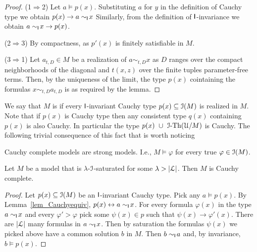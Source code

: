 \documentclass[10pt,oneside]{amsproc}
\renewcommand*{\emph}[1]{%
   \smash{\tikz[baseline]\node[rectangle, fill=teal!25, rounded corners, inner xsep=0.5ex, inner ysep=0.2ex, anchor=base, minimum height = 2.7ex]{\strut #1};}}
\begin{document}
\begin{proof}
  (1$\Rightarrow$2)
  Let $a\models p(x)$.
  Substituting $a$ for $y$ in the definition of Cauchy type we obtain $p(x)\rightarrow a\sim_{\sf I}\!x$
  Similarly, from the definition of ${\sf I}$-invariance we obtain $a\sim_{\sf I}\!x\rightarrow p(x)$.

  (2$\Rightarrow$3) 
  By compactness, as $p'(x)$ is finitely satisfiable in $M$.

  (3$\Rightarrow$1)  
  Let $a_{t,D}\in M$ be a realization of $a\sim_{t,D}x$ as $D$ ranges over the compact neighborhoods of the diagonal and $t(x,z)$ over the finite tuples parameter-free terms.
  Then, by the uniqueness of the limit, the type $p(x)$ cointaining the formulas $x\sim_{t,D}a_{t,D}$ is as required by the lemma.
\end{proof}

We say that $M$ is \emph{Cauchy complete\/} if every ${\sf I}$-invariant Cauchy type $p(x)\subseteq{\EuScript I}(M)$ is realized in $M$.
Note that if $p(x)$ is Cauchy type then any consistent type $q(x)$ containing $p(x)$ is also Cauchy.
In particular the type $p(x)\ \cup\ {\EuScript I}\mbox{-Th}({\EuScript U}/M)$ is Cauchy.
The following trivial consequence of this fact that is worth noticing

\begin{remark}
  Cauchy complete models are strong models. I.e., $M\models\varphi$ for every true $\varphi\in{\EuScript I}(M)$.
\end{remark}

\begin{fact}
  Let $M$ be a model that is $\lambda$-${\EuScript I}$-saturated for some $\lambda>|{\EuScript L}|$.
  Then $M$ is Cauchy complete.
\end{fact}

\begin{proof}  
  Let $p(x)\subseteq{\EuScript I}(M)$ be an ${\sf I}$-invariant Cauchy type.
  Pick any $a\models p(x)$.
  By Lemma~\ref{lem_Cauchyequiv}, $p(x)\leftrightarrow a\sim_{\sf I}\!x$.
  For every formula $\varphi(x)$ in the type $a\sim_{\sf I}\!x$ and every $\varphi'>\varphi$ pick some $\psi(x)\in p$ such that $\psi(x)\rightarrow\varphi'(x)$.
  There are $|{\EuScript L}|$ many formulas in $a\sim_{\sf I}\!x$.
  Then by saturation the formulas $\psi(x)$ we picked above have a common solution $b$ in $M$.
  Then $b\sim_{\sf I}\!a$ and, by invariance, $b\models p(x)$.
\end{proof}
\end{document}
